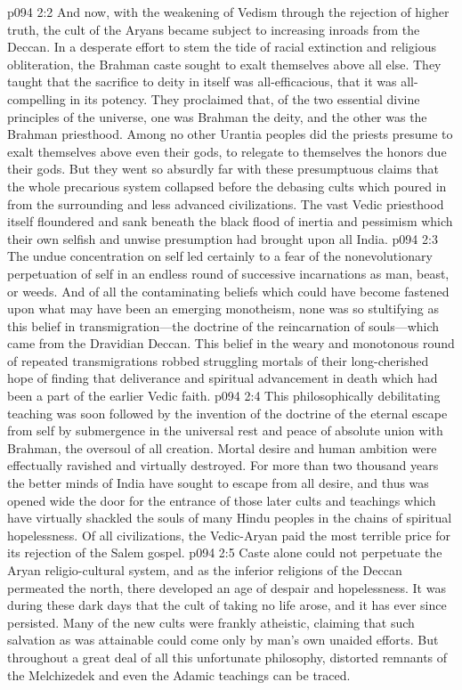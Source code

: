 \vs p094 2:2 And now, with the weakening of Vedism through the rejection of higher truth, the cult of the Aryans became subject to increasing inroads from the Deccan. In a desperate effort to stem the tide of racial extinction and religious obliteration, the Brahman caste sought to exalt themselves above all else. They taught that the sacrifice to deity in itself was all\hyp{}efficacious, that it was all\hyp{}compelling in its potency. They proclaimed that, of the two essential divine principles of the universe, one was Brahman the deity, and the other was the Brahman priesthood. Among no other Urantia peoples did the priests presume to exalt themselves above even their gods, to relegate to themselves the honors due their gods. But they went so absurdly far with these presumptuous claims that the whole precarious system collapsed before the debasing cults which poured in from the surrounding and less advanced civilizations. The vast Vedic priesthood itself floundered and sank beneath the black flood of inertia and pessimism which their own selfish and unwise presumption had brought upon all India.
\vs p094 2:3 The undue concentration on self led certainly to a fear of the nonevolutionary perpetuation of self in an endless round of successive incarnations as man, beast, or weeds. And of all the contaminating beliefs which could have become fastened upon what may have been an emerging monotheism, none was so stultifying as this belief in transmigration---the doctrine of the reincarnation of souls---which came from the Dravidian Deccan. This belief in the weary and monotonous round of repeated transmigrations robbed struggling mortals of their long\hyp{}cherished hope of finding that deliverance and spiritual advancement in death which had been a part of the earlier Vedic faith.
\vs p094 2:4 This philosophically debilitating teaching was soon followed by the invention of the doctrine of the eternal escape from self by submergence in the universal rest and peace of absolute union with Brahman, the oversoul of all creation. Mortal desire and human ambition were effectually ravished and virtually destroyed. For more than two thousand years the better minds of India have sought to escape from all desire, and thus was opened wide the door for the entrance of those later cults and teachings which have virtually shackled the souls of many Hindu peoples in the chains of spiritual hopelessness. Of all civilizations, the Vedic\hyp{}Aryan paid the most terrible price for its rejection of the Salem gospel.
\pc \vs p094 2:5 Caste alone could not perpetuate the Aryan religio\hyp{}cultural system, and as the inferior religions of the Deccan permeated the north, there developed an age of despair and hopelessness. It was during these dark days that the cult of taking no life arose, and it has ever since persisted. Many of the new cults were frankly atheistic, claiming that such salvation as was attainable could come only by man’s own unaided efforts. But throughout a great deal of all this unfortunate philosophy, distorted remnants of the Melchizedek and even the Adamic teachings can be traced.
